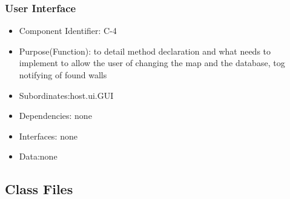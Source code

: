\documentclass[11pt, a4paper]{report}
\begin{document}
\subsubsection{User Interface}
\begin{itemize}
\item Component Identifier: C-4
\item Purpose(Function): to detail method declaration and what needs to implement 
 to allow the user of changing the map and the database, tog notifying of found walls
\item Subordinates:host.ui.GUI
\item Dependencies: none
\item Interfaces: none
\item Data:none
\end{itemize}
\subsection{Class Files}
\end{document}
